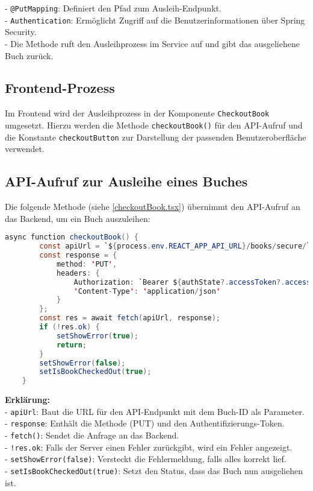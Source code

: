 \noindent - \texttt{@PutMapping}: Definiert den Pfad zum Ausleih-Endpunkt.\\
- \texttt{Authentication}: Ermöglicht Zugriff auf die Benutzerinformationen über Spring Security.\\
- Die Methode ruft den Ausleihprozess im Service auf und gibt das ausgeliehene Buch zurück.

\subsection{Frontend-Prozess}

Im Frontend wird der Ausleihprozess in der Komponente \texttt{CheckoutBook} umgesetzt. Hierzu werden die Methode \texttt{checkoutBook()} für den API-Aufruf und die Konstante \texttt{checkoutButton} zur Darstellung der passenden Benutzeroberfläche verwendet.

\subsection*{API-Aufruf zur Ausleihe eines Buches}

Die folgende Methode (siehe \ref{checkoutBook.tsx}) übernimmt den API-Aufruf an das Backend, um ein Buch auszuleihen:

\begin{lstlisting}[language=Java, caption=Implementierung der checkoutBook()-Funktion in CheckoutBook.tsx, label=checkoutBook.tsx, breaklines=true]
	async function checkoutBook() {
		const apiUrl = `${process.env.REACT_APP_API_URL}/books/secure/loans/checkout?bookId=${bookId}`;
		const response = {
			method: 'PUT',
			headers: {
				Authorization: `Bearer ${authState?.accessToken?.accessToken}`,
				'Content-Type': 'application/json'
			}
		};
		const res = await fetch(apiUrl, response);
		if (!res.ok) {
			setShowError(true);
			return;
		}
		setShowError(false);
		setIsBookCheckedOut(true);
	}
\end{lstlisting}

\noindent \textbf{Erklärung:}\\
- \texttt{apiUrl}: Baut die URL für den API-Endpunkt mit dem Buch-ID als Parameter.\\
- \texttt{response}: Enthält die Methode (PUT) und den Authentifizierungs-Token.\\
- \texttt{fetch()}: Sendet die Anfrage an das Backend.\\
- \texttt{!res.ok}: Falls der Server einen Fehler zurückgibt, wird ein Fehler angezeigt.\\
- \texttt{setShowError(false)}: Versteckt die Fehlermeldung, falls alles korrekt lief.\\
- \texttt{setIsBookCheckedOut(true)}: Setzt den Status, dass das Buch nun ausgeliehen ist.

